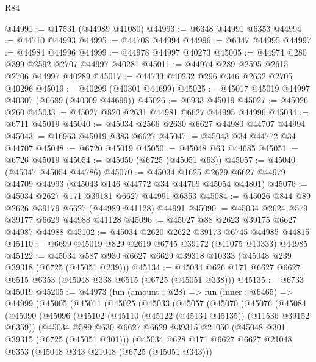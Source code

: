 \begin{lexlean}{R84}
\begin{coremodule}
@44991 := @17531 (@44989 @41080)
@44993 := @6348 @44991 @6353
@44994 := @44710 @44993
@44995 := @44708 @44994
@44996 := @6347 @44995
@44997 := @44984 @44996
@44999 := @44978 @44997 @40273
@45005 := @44974 @280 @399 @2592 @2707 @44997 @40281
@45011 := @44974 @289 @2595 @2615 @2706 @44997 @40289
@45017 := @44733 @40232 @296 @346 @2632 @2705 @40296
@45019 := @40299 (@40301 @44699)
@45025 := @45017 @45019 @44997 @40307 (@6689 (@40309 @44699))
@45026 := @6933 @45019
@45027 := @45026 @260
@45033 := @45027 @820 @2631 @44981 @6627 @44995 @44996
@45034 := @6711 @45019
@45040 := @45034 @2566 @2630 @6627 @44980 @44707 @44994
@45043 := @16963 @45019 @383 @6627
@45047 := @45043 @34 @44772 @34 @44707
@45048 := @6720 @45019
@45050 := @45048 @63 @44685
@45051 := @6726 @45019
@45054 := @45050 (@6725 (@45051 @63))
@45057 := @45040 (@45047 @45054 @44786)
@45070 := @45034
    @1625
    @2629
    @6627
    @44979
    @44709
    @44993
    (@45043 @146 @44772 @34 @44709 @45054 @44801)
@45076 := @45034 @2627 @171 @39181 @6627 @44991 @6353
@45084 := @45026 @844 @89 @2626 @39179 @6627 (@44989 @41128) @44991
@45090 := @45034 @2624 @579 @39177 @6629 @44988 @41128
@45096 := @45027 @88 @2623 @39175 @6627 @44987 @44988
@45102 := @45034 @2620 @2622 @39173 @6745 @44985 @44815
@45110 := @6699 @45019 @829 @2619 @6745 @39172 (@41075 @10333) @44985
@45122 := @45034 @587 @930 @6627 @6629 @39318 @10333 (@45048 @239 @39318 (@6725 (@45051 @239)))
@45134 := @45034 @626 @171 @6627 @6627 @6515 @6353 (@45048 @338 @6515 (@6725 (@45051 @338)))
@45135 := @6733 @45019
@45205 := @44973
    (fun (amount : @28) =>
    fun (inner : @6465) =>
    @44999
      (@45005
        (@45011
          (@45025
            (@45033
              (@45057
                (@45070
                  (@45076
                    (@45084
                      (@45090
                        (@45096
                          (@45102
                            (@45110 (@45122 (@45134 @45135)) (@11536 @39152 @6359))
                            (@45034
                              @589
                              @630
                              @6627
                              @6629
                              @39315
                              @21050
                              (@45048 @301 @39315 (@6725 (@45051 @301)))
                              (@45034
                                @628
                                @171
                                @6627
                                @6627
                                @21048
                                @6353
                                (@45048 @343 @21048 (@6725 (@45051 @343)))

\end{coremodule}
\end{lexlean}
